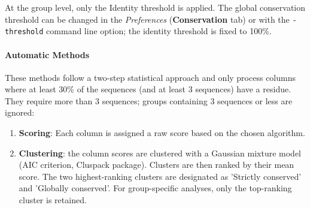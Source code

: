 \documentclass[a4paper]{article}
\begin{document}
At the group level, only the Identity threshold is applied. The global conservation threshold can be changed in the \textit{Preferences} (\textbf{Conservation} tab) or with the \texttt{-threshold} command line option; the identity threshold is fixed to 100\%.

\paragraph{Automatic Methods}
These methods follow a two-step statistical approach and only process columns where at least 30\% of the sequences (and at least 3 sequences) have a residue. They require more than 3 sequences; groups containing 3 sequences or less are ignored:
\begin{enumerate}
    \item \textbf{Scoring}: Each column is assigned a raw score based on the chosen algorithm.
    \item \textbf{Clustering}: the column scores are clustered with a Gaussian mixture model (AIC criterion, Cluspack package). Clusters are then ranked by their mean score. The two highest-ranking clusters are designated as 'Strictly conserved' and 'Globally conserved'. For group-specific analyses, only the top-ranking cluster is retained.
\end{enumerate}
\end{document}
